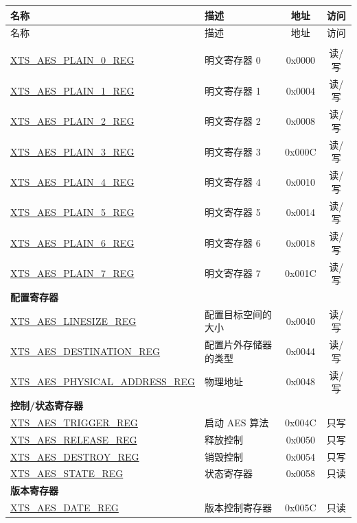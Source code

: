 

\begin{longtable}{ | p{6.0cm} | p{6.6cm} | c | c| }
\hline\rowcolor{lightgray}
名称 & 描述 & 地址 & 访问 \\ \hline
\endfirsthead
\hline
\rowcolor{lightgray}
名称 & 描述 & 地址 & 访问  \\
\hline
\endhead
\endfoot

\multicolumn{4}{|l|}{\textbf{明文寄存器堆}} \\\hline
\hyperref[regdesc:XTSAESPLAINNREG]{XTS\_AES\_PLAIN\_0\_REG}  & 明文寄存器 0   & 0x0000 & 读/写 \\\hline
\hyperref[regdesc:XTSAESPLAINNREG]{XTS\_AES\_PLAIN\_1\_REG}  & 明文寄存器 1   & 0x0004 & 读/写 \\\hline
\hyperref[regdesc:XTSAESPLAINNREG]{XTS\_AES\_PLAIN\_2\_REG}  & 明文寄存器 2   & 0x0008 & 读/写 \\\hline
\hyperref[regdesc:XTSAESPLAINNREG]{XTS\_AES\_PLAIN\_3\_REG}  & 明文寄存器 3   & 0x000C & 读/写 \\\hline
\hyperref[regdesc:XTSAESPLAINNREG]{XTS\_AES\_PLAIN\_4\_REG}  & 明文寄存器 4   & 0x0010 & 读/写 \\\hline
\hyperref[regdesc:XTSAESPLAINNREG]{XTS\_AES\_PLAIN\_5\_REG}  & 明文寄存器 5   & 0x0014 & 读/写 \\\hline
\hyperref[regdesc:XTSAESPLAINNREG]{XTS\_AES\_PLAIN\_6\_REG}  & 明文寄存器 6   & 0x0018 & 读/写 \\\hline
\hyperref[regdesc:XTSAESPLAINNREG]{XTS\_AES\_PLAIN\_7\_REG}  & 明文寄存器 7   & 0x001C & 读/写 \\\hline
\multicolumn{4}{|l|}{\textbf{配置寄存器}} \\ \hline
\hyperref[regdesc:XTSAESLINESIZEREG]       {XTS\_AES\_LINESIZE\_REG         }  & 配置目标空间的大小 & 0x0040 & 读/写 \\\hline
\hyperref[regdesc:XTSAESDESTINATIONREG]    {XTS\_AES\_DESTINATION\_REG      }  & 配置片外存储器的类型   & 0x0044 & 读/写 \\\hline
\hyperref[regdesc:XTSAESPHYSICALADDRESSREG]{XTS\_AES\_PHYSICAL\_ADDRESS\_REG}  & 物理地址   & 0x0048 & 读/写 \\\hline
\multicolumn{4}{|l|}{\textbf{控制/状态寄存器}} \\ \hline
\hyperref[regdesc:XTSAESTRIGGERREG]        {XTS\_AES\_TRIGGER\_REG          }  & 启动 AES 算法         & 0x004C & 只写 \\\hline
\hyperref[regdesc:XTSAESRELEASEREG]        {XTS\_AES\_RELEASE\_REG          }  & 释放控制         & 0x0050 & 只写 \\\hline
\hyperref[regdesc:XTSAESDESTROYREG]        {XTS\_AES\_DESTROY\_REG          }  & 销毁控制         & 0x0054 & 只写 \\\hline
\hyperref[regdesc:XTSAESSTATEREG]          {XTS\_AES\_STATE\_REG            }  & 状态寄存器       & 0x0058 & 只读 \\\hline
\multicolumn{4}{|l|}{\textbf{版本寄存器}} \\ \hline
\hyperref[regdesc:XTSAESDATEREG]           {XTS\_AES\_DATE\_REG             }  & 版本控制寄存器   & 0x005C & 只读 \\\hline

\end{longtable}
